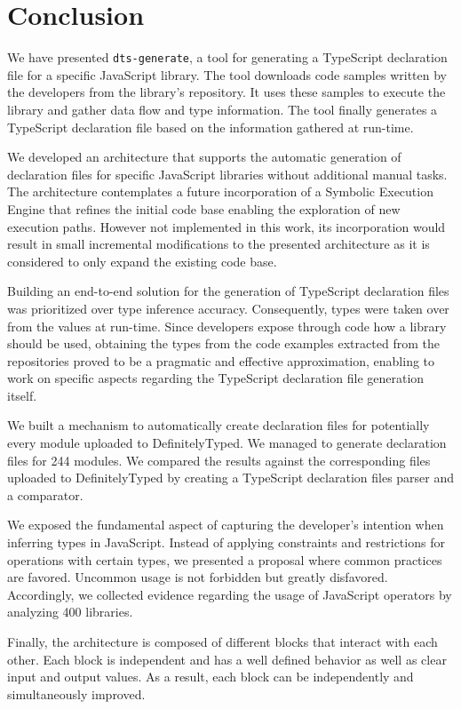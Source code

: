 \documentclass[a4paper,english,cleveref, autoref]{lipics-v2019}
\begin{document}
\section{Conclusion}
We have presented \lstinline{dts-generate}, a tool for generating a TypeScript declaration file for a specific JavaScript library. The tool downloads code samples written by the developers from the library's repository. It uses these samples to execute the library and gather data flow and type information. The tool finally generates a TypeScript declaration file based on the information gathered at run-time.

We developed an architecture that supports the automatic generation of declaration files for specific JavaScript libraries without additional manual tasks. The architecture contemplates a future incorporation of a Symbolic Execution Engine that refines the initial code base enabling the exploration of new execution paths. However not implemented in this work, its incorporation would result in small incremental modifications to the presented architecture as it is considered to only expand the existing code base.

Building an end-to-end solution for the generation of TypeScript declaration files was prioritized over type inference accuracy. Consequently, types were taken over from the values at run-time. Since developers expose through code how a library should be used, obtaining the types from the code examples extracted from the repositories proved to be a pragmatic and effective approximation, enabling to work on specific aspects regarding the TypeScript declaration file generation itself.

We built a mechanism to automatically create declaration files for potentially every module uploaded to DefinitelyTyped. We managed to generate declaration files for 244 modules. We compared the results against the corresponding files uploaded to DefinitelyTyped by creating a TypeScript declaration files parser and a comparator.

We exposed the fundamental aspect of capturing the developer's intention when inferring types in JavaScript. Instead of applying constraints and restrictions for operations with certain types, we presented a proposal where common practices are favored. Uncommon usage is not forbidden but greatly disfavored. Accordingly, we collected evidence regarding the usage of JavaScript operators by analyzing 400 libraries.

Finally, the architecture is composed of different blocks that interact with each other. Each block is independent and has a well defined behavior as well as clear input and output values. As a result, each block can be independently and simultaneously improved.



\end{document}

